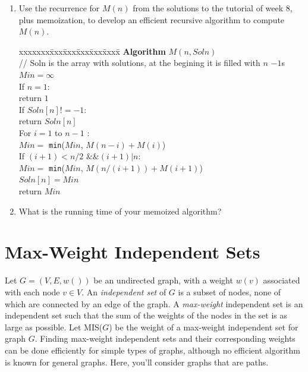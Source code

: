 \documentclass[11pt]{article}
\def\question#1{\red{#1}}
\def\soln#1{\par\blu{#1}} %
\def\blu#1{{\color{blu}#1}}
\def\red#1{{\color{red}#1}}
\begin{document}
\begin{enumerate}
\item \question{Use the recurrence for $M(n)$ from the solutions to the tutorial of week 8, plus memoization, to develop an efficient recursive algorithm to compute $M(n)$.}
\soln{
  \begin{tabbing}
  xxxxxxx\=xxx\=xxx\=xxx\=xxx\=xxxx\= \kill
  \> {\bf Algorithm} $M(n, Soln)$ \\
  \>\> // Soln is the array with solutions, at the begining it is filled with $n$ $-1$s \\
  \>\> $Min = \infty$ \\
  \>\> If $n = 1 :$ \\
  \>\>\> return $1$ \\
  \>\> If $Soln[n] != -1 :$ \\
  \>\>\> return $Soln[n]$ \\
  \>\> For $i = 1$ to $n-1$ $:$ \\
  \>\>\> $Min = $ \texttt{min}($Min$, $M(n-i)+M(i)$) \\
  \>\>\> If $(i+1) < n/2 \text{ \&\& } (i+1)|n : $ \\
  \>\>\>\> $Min = $ \texttt{min}($Min$, $M(n/(i+1))+M(i+1)$) \\
  \>\> $Soln[n] = Min$ \\
  \>\> return $Min$ \\
  \end{tabbing}
}

\item \question{What is the running time of your memoized algorithm?}
\end{enumerate}

\section{Max-Weight Independent Sets}
\label{sec-4}
Let $G=(V,E,w())$ be an undirected graph, with a weight $w(v)$
associated with each node $v\in V$.  An \emph{independent set} of $G$ is a
subset of nodes, none of which are connected by an edge of the
graph. A \emph{max-weight} independent set is an
independent set such that the sum of the weights of the nodes in the
set is as large as possible. 
Let MIS($G$) be the weight of a max-weight independent set for graph $G$.
Finding max-weight independent sets and their corresponding weights
can be done efficiently for simple types of graphs, although no efficient
algorithm is known for general graphs. Here, you'll consider graphs
that are paths.
\end{document}
